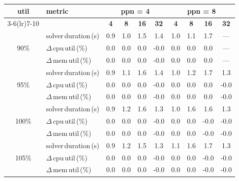 \begin{tabular}{@{}c l *{8}{c}@{}}
\toprule
\multirow{2}{*}{\textbf{util}} & \multirow{2}{*}{\textbf{metric}} &\multicolumn{4}{c}{\textbf{ppn = 4}} & \multicolumn{4}{c}{\textbf{ppn = 8}}\\
\cmidrule(lr){3-6}\cmidrule(lr){7-10}
 &  & \textbf{4} & \textbf{8} & \textbf{16} & \textbf{32} & \textbf{4} & \textbf{8} & \textbf{16} & \textbf{32}\\
\midrule
\multirow{3}{*}{90\%}
& solver\,duration\,(s) & 0.9 & 1.0 & 1.5 & 1.4 & 1.0 & 1.1 & 1.7 & \multicolumn{1}{c}{—} \\
& $\Delta$\,cpu\,util\,(\%) & 0.0 & 0.0 & 0.0 & -0.0 & 0.0 & 0.0 & 0.0 & \multicolumn{1}{c}{—} \\
& $\Delta$\,mem\,util\,(\%) & 0.0 & 0.0 & 0.0 & -0.0 & 0.0 & 0.0 & 0.0 & \multicolumn{1}{c}{—} \\
\midrule
\multirow{3}{*}{95\%}
& solver\,duration\,(s) & 0.9 & 1.1 & 1.6 & 1.4 & 1.0 & 1.2 & 1.7 & 1.3 \\
& $\Delta$\,cpu\,util\,(\%) & 0.0 & 0.0 & 0.0 & -0.0 & 0.0 & 0.0 & 0.0 & -0.0 \\
& $\Delta$\,mem\,util\,(\%) & 0.0 & 0.0 & 0.0 & -0.0 & 0.0 & 0.0 & 0.0 & -0.0 \\
\midrule
\multirow{3}{*}{100\%}
& solver\,duration\,(s) & 0.9 & 1.2 & 1.6 & 1.3 & 1.0 & 1.6 & 1.6 & 1.3 \\
& $\Delta$\,cpu\,util\,(\%) & 0.0 & 0.0 & 0.0 & -0.0 & 0.0 & 0.0 & -0.0 & -0.0 \\
& $\Delta$\,mem\,util\,(\%) & 0.0 & 0.0 & 0.0 & -0.0 & 0.0 & 0.0 & -0.0 & -0.0 \\
\midrule
\multirow{3}{*}{105\%}
& solver\,duration\,(s) & 0.9 & 1.2 & 1.5 & 1.3 & 1.1 & 1.6 & 1.7 & 1.3 \\
& $\Delta$\,cpu\,util\,(\%) & 0.0 & 0.0 & 0.0 & -0.0 & 0.0 & 0.0 & -0.0 & -0.0 \\
& $\Delta$\,mem\,util\,(\%) & 0.0 & 0.0 & 0.0 & -0.0 & 0.0 & 0.0 & -0.0 & -0.0 \\
\bottomrule
\end{tabular}
